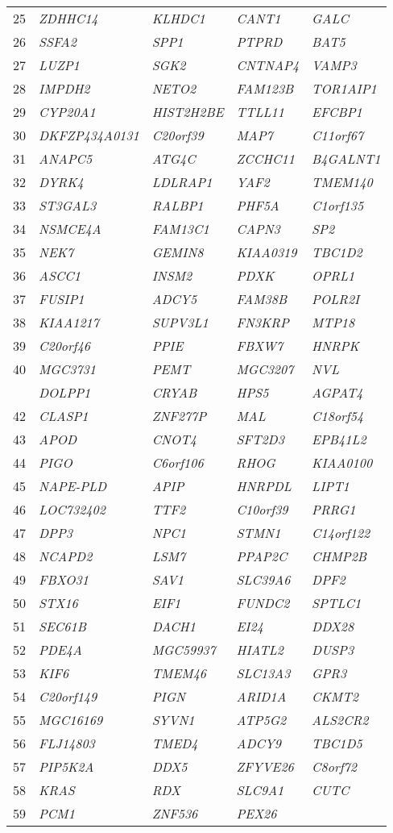 \documentclass[letterpaper,12pt]{article}
\numberwithin{equation}{appendix}
\begin{document}
\begin{longtable}[c]{r>{\itshape}l>{\itshape}l>{\itshape}l>{\itshape}l}
25&ZDHHC14&KLHDC1&CANT1&GALC\tabularnewline
26&SSFA2&SPP1&PTPRD&BAT5\tabularnewline
27&LUZP1&SGK2&CNTNAP4&VAMP3\tabularnewline
28&IMPDH2&NETO2&FAM123B&TOR1AIP1\tabularnewline
29&CYP20A1&HIST2H2BE&TTLL11&EFCBP1\tabularnewline
30&DKFZP434A0131&C20orf39&MAP7&C11orf67\tabularnewline
31&ANAPC5&ATG4C&ZCCHC11&B4GALNT1\tabularnewline
32&DYRK4&LDLRAP1&YAF2&TMEM140\tabularnewline
33&ST3GAL3&RALBP1&PHF5A&C1orf135\tabularnewline
34&NSMCE4A&FAM13C1&CAPN3&SP2\tabularnewline
35&NEK7&GEMIN8&KIAA0319&TBC1D2\tabularnewline
36&ASCC1&INSM2&PDXK&OPRL1\tabularnewline
37&FUSIP1&ADCY5&FAM38B&POLR2I\tabularnewline
38&KIAA1217&SUPV3L1&FN3KRP&MTP18\tabularnewline
39&C20orf46&PPIE&FBXW7&HNRPK\tabularnewline
40&MGC3731&PEMT&MGC3207&NVL\tabularnewline
\newpage
41&DOLPP1&CRYAB&HPS5&AGPAT4\tabularnewline
42&CLASP1&ZNF277P&MAL&C18orf54\tabularnewline
43&APOD&CNOT4&SFT2D3&EPB41L2\tabularnewline
44&PIGO&C6orf106&RHOG&KIAA0100\tabularnewline
45&NAPE-PLD&APIP&HNRPDL&LIPT1\tabularnewline
46&LOC732402&TTF2&C10orf39&PRRG1\tabularnewline
47&DPP3&NPC1&STMN1&C14orf122\tabularnewline
48&NCAPD2&LSM7&PPAP2C&CHMP2B\tabularnewline
49&FBXO31&SAV1&SLC39A6&DPF2\tabularnewline
50&STX16&EIF1&FUNDC2&SPTLC1\tabularnewline
51&SEC61B&DACH1&EI24&DDX28\tabularnewline
52&PDE4A&MGC59937&HIATL2&DUSP3\tabularnewline
53&KIF6&TMEM46&SLC13A3&GPR3\tabularnewline
54&C20orf149&PIGN&ARID1A&CKMT2\tabularnewline
55&MGC16169&SYVN1&ATP5G2&ALS2CR2\tabularnewline
56&FLJ14803&TMED4&ADCY9&TBC1D5\tabularnewline
57&PIP5K2A&DDX5&ZFYVE26&C8orf72\tabularnewline
58&KRAS&RDX&SLC9A1&CUTC\tabularnewline
59&PCM1&ZNF536&PEX26&\tabularnewline
\bottomrule
\end{longtable}
\end{document}
